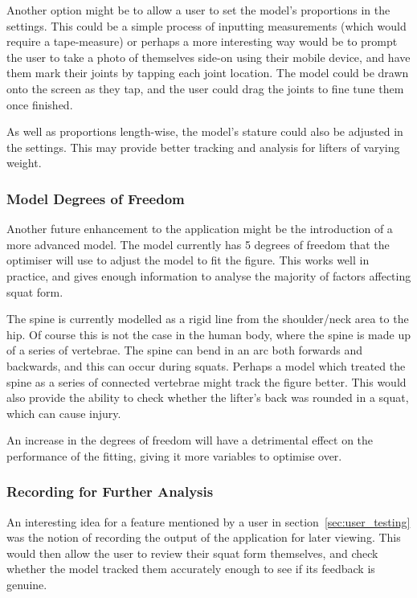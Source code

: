 Another option might be to allow a user to set the model's proportions in the settings. This could be a simple process of inputting measurements (which would require a tape-measure) or perhaps a more interesting way would be to prompt the user to take a photo of themselves side-on using their mobile device, and have them mark their joints by tapping each joint location. The model could be drawn onto the screen as they tap, and the user could drag the joints to fine tune them once finished.

As well as proportions length-wise, the model's stature could also be adjusted in the settings. This may provide better tracking and analysis for lifters of varying weight.

\subsubsection{Model Degrees of Freedom}

Another future enhancement to the application might be the introduction of a more advanced model. The model currently has 5 degrees of freedom that the optimiser will use to adjust the model to fit the figure. This works well in practice, and gives enough information to analyse the majority of factors affecting squat form.

The spine is currently modelled as a rigid line from the shoulder/neck area to the hip. Of course this is not the case in the human body, where the spine is made up of a series of vertebrae. The spine can bend in an arc both forwards and backwards, and this can occur during squats. Perhaps a model which treated the spine as a series of connected vertebrae might track the figure better. This would also provide the ability to check whether the lifter's back was rounded in a squat, which can cause injury.

An increase in the degrees of freedom will have a detrimental effect on the performance of the fitting, giving it more variables to optimise over.

\subsubsection{Recording for Further Analysis}

An interesting idea for a feature mentioned by a user in section~\ref{sec:user_testing} was the notion of recording the output of the application for later viewing. This would then allow the user to review their squat form themselves, and check whether the model tracked them accurately enough to see if its feedback is genuine.

